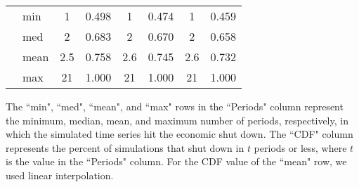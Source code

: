 \documentclass[letterpaper,12pt]{article}
\theoremstyle{definition}
\begin{document}
\begin{spacing}{1.5}
\begin{table}[htbp]
\begin{threeparttable}
\begin{tabular}{>{\small}c >{\small}l| >{\small}c >{\small}c| >{\small}c >{\small}c| >{\small}c >{\small}c}
      \hline
      \multirow{4}{*}{$\bar{H}=0.17$}
      & min & 1 & 0.498 & 1 & 0.474 & 1 & 0.459 \\
      & med & 2 & 0.683 & 2 & 0.670 & 2 & 0.658 \\
      & mean & 2.5 & 0.758 & 2.6 & 0.745 & 2.6 & 0.732 \\
      & max & 21 & 1.000 & 21 & 1.000 & 21 & 1.000 \\
      \hline\hline
    \end{tabular}
    \begin{tablenotes}
      \scriptsize{\item[]The ``min", ``med", ``mean", and ``max" rows in the ``Periods" column represent the minimum, median, mean, and maximum number of periods, respectively, in which the simulated time series hit the economic shut down. The ``CDF" column represents the percent of simulations that shut down in $t$ periods or less, where $t$ is the value in the ``Periods" column. For the CDF value of the ``mean" row, we used linear interpolation.}
    \end{tablenotes}
    \end{threeparttable}
  \end{table}


\end{spacing}
\end{document}
